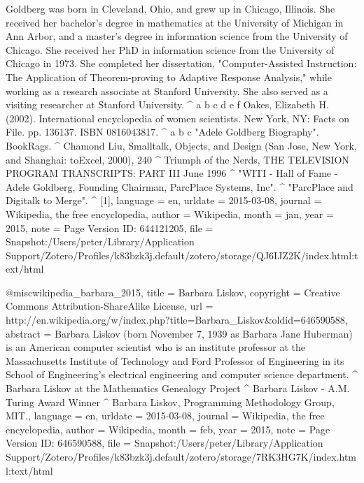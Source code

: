 {{{Goldberg was born in Cleveland, Ohio, and grew up in Chicago, Illinois. She received her bachelor's degree in mathematics at the University of Michigan in Ann Arbor, and a master's degree in information science from the University of Chicago. She received her PhD in information science from the University of Chicago in 1973. She completed her dissertation, "Computer-Assisted Instruction: The Application of Theorem-proving to Adaptive Response Analysis," while working as a research associate at Stanford University. She also served as a visiting researcher at Stanford University.
{\textasciicircum} a b c d e f Oakes, Elizabeth H. (2002). International encyclopedia of women scientists. New York, NY: Facts on File. pp. 136{\textendash}137. ISBN 0816043817. 
{\textasciicircum} a b c "Adele Goldberg Biography". BookRags. 
{\textasciicircum} Chamond Liu, Smalltalk, Objects, and Design (San Jose, New York, and Shanghai: toExcel, 2000), 240
{\textasciicircum} Triumph of the Nerds, THE TELEVISION PROGRAM TRANSCRIPTS: PART III June 1996
{\textasciicircum} "WITI - Hall of Fame - Adele Goldberg, Founding Chairman, ParcPlace Systems, Inc". 
{\textasciicircum} "ParcPlace and Digitalk to Merge". 
{\textasciicircum} [1]},
	language = {en},
	urldate = {2015-03-08},
	journal = {Wikipedia, the free encyclopedia},
	author = {{Wikipedia}},
	month = jan,
	year = {2015},
	note = {Page Version ID: 644121205},
	file = {Snapshot:/Users/peter/Library/Application Support/Zotero/Profiles/k83bzk3j.default/zotero/storage/QJ6IJZ2K/index.html:text/html}
}

@misc{wikipedia_barbara_2015,
	title = {Barbara {Liskov}},
	copyright = {Creative Commons Attribution-ShareAlike License},
	url = {http://en.wikipedia.org/w/index.php?title=Barbara_Liskov&oldid=646590588},
	abstract = {Barbara Liskov (born November 7, 1939 as Barbara Jane Huberman) is an American computer scientist who is an institute professor at the Massachusetts Institute of Technology and Ford Professor of Engineering in its School of Engineering's electrical engineering and computer science department.
{\textasciicircum} Barbara Liskov at the Mathematics Genealogy Project
{\textasciicircum} Barbara Liskov - A.M. Turing Award Winner
{\textasciicircum} Barbara Liskov, Programming Methodology Group, MIT.},
	language = {en},
	urldate = {2015-03-08},
	journal = {Wikipedia, the free encyclopedia},
	author = {{Wikipedia}},
	month = feb,
	year = {2015},
	note = {Page Version ID: 646590588},
	file = {Snapshot:/Users/peter/Library/Application Support/Zotero/Profiles/k83bzk3j.default/zotero/storage/7RK3HG7K/index.html:text/html}
}

}
